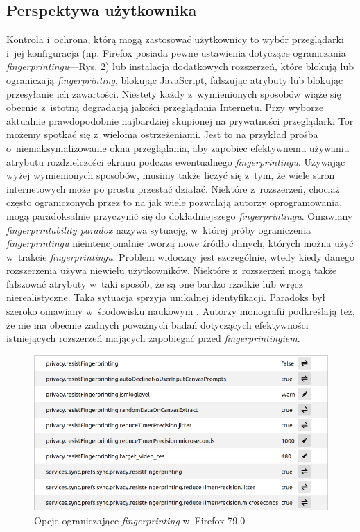 \subsection{Perspektywa użytkownika}
Kontrola i~ochrona, którą mogą zastosować użytkownicy to wybór przeglądarki
i~jej konfiguracja (np. Firefox posiada pewne ustawienia dotyczące ograniczania
\emph{fingerprintingu}---Rys. 2) lub instalacja dodatkowych rozszerzeń, które
blokują lub ograniczają \emph{fingerprinting}, blokując JavaScript, fałszując
atrybuty lub blokując przesyłanie ich zawartości. Niestety każdy z~wymienionych
sposobów wiąże się obecnie z~istotną degradacją jakości przeglądania Internetu.
Przy wyborze aktualnie prawdopodobnie najbardziej skupionej na prywatności
przeglądarki Tor możemy spotkać się z~wieloma ostrzeżeniami. Jest to na przykład
prośba o~niemaksymalizowanie okna przeglądania, aby zapobiec efektywnemu
używaniu atrybutu rozdzielczości ekranu podczas ewentualnego
\emph{fingerprintingu}. Używając wyżej wymienionych sposobów, musimy także
liczyć się z~tym, że wiele stron internetowych może po prostu przestać działać.
Niektóre z~rozszerzeń, chociaż często ograniczonych przez to na jak wiele
pozwalają autorzy oprogramowania, mogą paradoksalnie przyczynić się do
dokładniejszego \emph{fingerprintingu}. Omawiany \emph{fingerprintability
	paradox} nazywa sytuację, w~której próby ograniczenia \emph{fingerprintingu}
nieintencjonalnie tworzą nowe źródło danych, których można użyć w~trakcie
\emph{fingerprintingu}. Problem widoczny jest szczególnie, wtedy kiedy danego
rozszerzenia używa niewielu użytkowników. Niektóre z~rozszerzeń mogą także
fałszować atrybuty w~taki sposób, że są one bardzo rzadkie lub wręcz
nierealistyczne. Taka sytuacja sprzyja unikalnej identyfikacji. Paradoks był
szeroko omawiany w~środowisku naukowym \cite{eckersley2010unique,torres2015fp}.
Autorzy monografii podkreślają też, że nie ma obecnie żadnych poważnych badań
dotyczących efektywności istniejących rozszerzeń mających zapobiegać przed
\emph{fingerprintingiem}.

\begin{figure}
	\includegraphics[width=\textwidth,keepaspectratio]{img/02}
	\caption{Opcje ograniczające \emph{fingerprinting} w~Firefox 79.0}
\end{figure}


